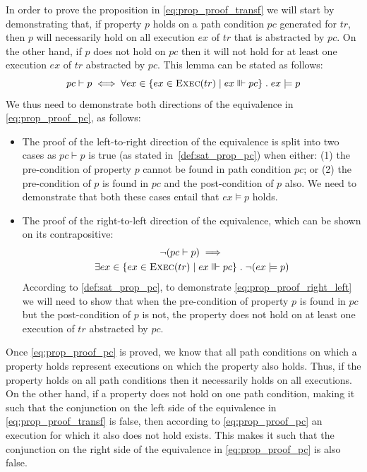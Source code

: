 \begin{ps}
In order to prove the proposition in \cref{eq:prop_proof_transf} we will start by demonstrating that,
if property $p$ holds on a path condition $pc$ generated for $tr$,
then $p$ will necessarily hold on all execution $ex$ of $tr$ that is abstracted by $pc$. On the other hand, if $p$ does not hold on $pc$ then it will not hold for at least one execution $ex$ of $tr$ abstracted by $pc$. This lemma can be stated as follows:
\begin{equation}
\label{eq:prop_proof_pc}
pc\vdash p \;\Longleftrightarrow \;\forall ex\in\{ex\in\textsc{Exec}(tr)\;|\;ex\Vvdash pc\}\;.\; ex\models p
\end{equation}
We thus need to demonstrate both directions of the equivalence in \cref{eq:prop_proof_pc}, as follows:
\begin{itemize}
\item The proof of the left-to-right direction of the equivalence is split
into two cases as $pc\vdash p$ is true (as stated
in~\cref{def:sat_prop_pc}) when either: (1) the pre-condition of property $p$ cannot
be found in path condition $pc$; or (2) the pre-condition of $p$ is
found in $pc$ and the post-condition of $p$ also.
We need to demonstrate that both these cases entail that $ex\models p$ holds.
\item The proof of the right-to-left direction of the equivalence, which can be shown on its contrapositive:
\begin{multline}
\label{eq:prop_proof_right_left}
\neg(pc\vdash p) \;\Longrightarrow \;\\\exists ex\in\{ex\in\textsc{Exec}(tr)\;|\;ex\Vvdash pc\}\;.\; \neg(ex\models p)
\end{multline}
According to \cref{def:sat_prop_pc}, to demonstrate \cref{eq:prop_proof_right_left} we will need to show that when the pre-condition of property $p$ is found in $pc$ but the post-condition of $p$ is not, the property does not hold on at least one execution of $tr$ abstracted by $pc$.
\end{itemize}
	
Once \cref{eq:prop_proof_pc} is proved, we know that all path conditions on which a property holds represent executions on which the property also holds. Thus, if the property holds on all path conditions then it necessarily holds on all executions. On the other hand, if a property does not hold on one path condition, making it such that the conjunction on the left side of the equivalence in \cref{eq:prop_proof_transf} is false, then according to \cref{eq:prop_proof_pc} an execution for which it also does not hold exists. This makes it such that the conjunction on the right side of the equivalence in \cref{eq:prop_proof_pc} is also false.
\end{ps}


